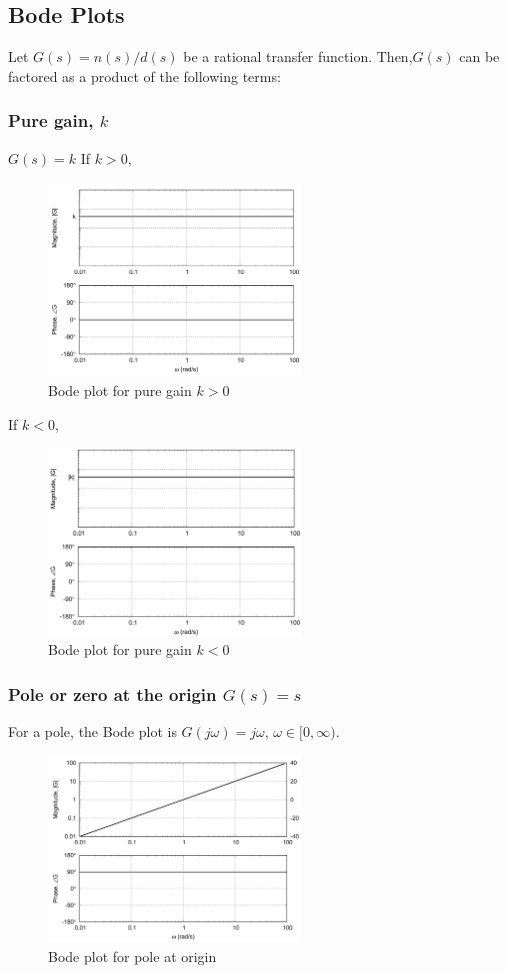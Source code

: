 \documentclass[letterpaper,12pt]{article}
\begin{document}
\subsection{Bode Plots}
Let $G(s)=n(s)/d(s)$ be a rational transfer function. Then,$G(s)$ can be factored as a product of the following terms:
\subsubsection{Pure gain, $k$}
$G(s) = k$
If $k > 0$, 
\begin{figure}[h]
    \centering
    \includegraphics[width=0.6\textwidth]{case1 pure gain greater than 0.png}
    \caption{Bode plot for pure gain $k > 0$}
\end{figure}
If $k < 0$,
\begin{figure}[h]
    \centering
    \includegraphics[width=0.6\textwidth]{case2 pure gain less than 0.png}
    \caption{Bode plot for pure gain $k < 0$}
\end{figure}
\FloatBarrier
\subsubsection{Pole or zero at the origin $G(s) = s$}
For a pole, the Bode plot is $G(j \omega) = j\omega$, $\omega \in [0, \infty)$.
\begin{figure}[h]
    \centering
    \includegraphics[width=0.6\textwidth]{case3 pole or zero at origin.png}
    \caption{Bode plot for pole at origin}
\end{figure}
\FloatBarrier
\end{document}
